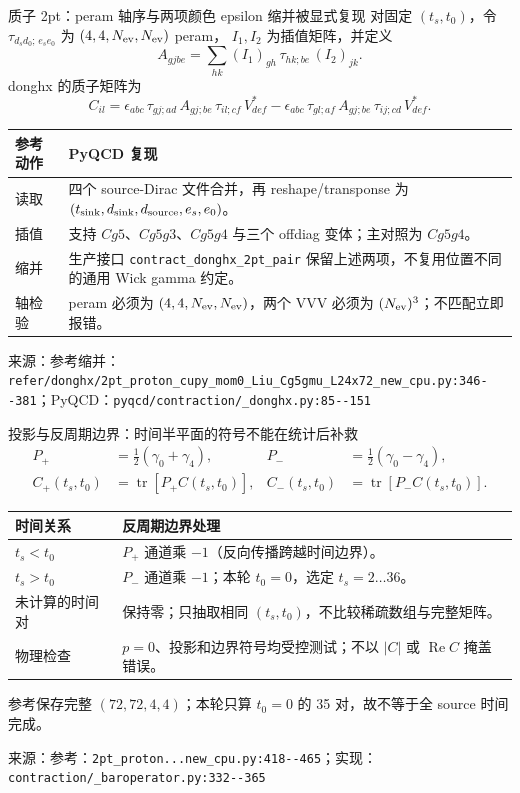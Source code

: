 \documentclass[UTF8,aspectratio=169,11pt]{ctexbeamer}
\newcommand{\source}[1]{\vspace{0.05em}\par{\raggedright\scriptsize\color{muted}来源：#1\par}}
\newcommand{\codepath}[1]{\nolinkurl{#1}}
\begin{document}
\begin{frame}[t]{质子 2pt：peram 轴序与两项颜色 epsilon 缩并被显式复现}
  \footnotesize
  对固定 $(t_s,t_0)$，令 $\tau_{d_s d_0;\,e_s e_0}$ 为 $(4,4,N_{\rm ev},N_{\rm ev})$ peram，
  $I_1,I_2$ 为插值矩阵，并定义
  \[
    A_{g j b e}=\sum_{h k}(I_1)_{g h}\,\tau_{h k;b e}\,(I_2)_{j k}.
  \]
  donghx 的质子矩阵为
  \[
    C_{il}=\epsilon_{abc}\,\tau_{g j;a d}\,A_{g j;b e}\,
      \tau_{i l;c f}\,V^{*}_{def}
    -\epsilon_{abc}\,\tau_{g l;a f}\,A_{g j;b e}\,
      \tau_{i j;c d}\,V^{*}_{def}.
  \]
  \begin{tabularx}{0.96\textwidth}{@{}L Y@{}}
    \toprule
    参考动作 & PyQCD 复现\\
    \midrule
    读取 & 四个 source-Dirac 文件合并，再 reshape/transponse 为 $(t_{\rm sink},d_{\rm sink},d_{\rm source},e_s,e_0)$。\\
    插值 & 支持 $Cg5$、$Cg5g3$、$Cg5g4$ 与三个 offdiag 变体；主对照为 $Cg5g4$。\\
    缩并 & 生产接口 \codepath{contract_donghx_2pt_pair} 保留上述两项，不复用位置不同的通用 Wick gamma 约定。\\
    轴检验 & peram 必须为 $(4,4,N_{\rm ev},N_{\rm ev})$，两个 VVV 必须为 $(N_{\rm ev})^3$；不匹配立即报错。\\
    \bottomrule
  \end{tabularx}
  \source{参考缩并：\codepath{refer/donghx/2pt_proton_cupy_mom0_Liu_Cg5gmu_L24x72_new_cpu.py:346--381}；PyQCD：\codepath{pyqcd/contraction/_donghx.py:85--151}}
\end{frame}

\begin{frame}[t]{投影与反周期边界：时间半平面的符号不能在统计后补救}
  \footnotesize
  \begin{align*}
    P_+&=\frac12(\gamma_0+\gamma_4), & P_-&=\frac12(\gamma_0-\gamma_4),\\
    C_+(t_s,t_0)&=\operatorname{tr}[P_+C(t_s,t_0)],
    &C_-(t_s,t_0)&=\operatorname{tr}[P_-C(t_s,t_0)].
  \end{align*}
  \renewcommand{\arraystretch}{1.00}
  \begin{tabularx}{0.96\textwidth}{@{}L Y@{}}
    \toprule
    时间关系 & 反周期边界处理\\
    \midrule
    $t_s<t_0$ & $P_+$ 通道乘 $-1$（反向传播跨越时间边界）。\\
    $t_s>t_0$ & $P_-$ 通道乘 $-1$；本轮 $t_0=0$，选定 $t_s=2\ldots36$。\\
    未计算的时间对 & 保持零；只抽取相同 $(t_s,t_0)$，不比较稀疏数组与完整矩阵。\\
    物理检查 & $p=0$、投影和边界符号均受控测试；不以 $|C|$ 或 $\operatorname{Re}C$ 掩盖错误。\\
    \bottomrule
  \end{tabularx}
  \colorbox{warnbg}{\parbox{0.94\linewidth}{\centering
    参考保存完整 $(72,72,4,4)$；本轮只算 $t_0=0$ 的 35 对，故不等于全 source 时间完成。}}
  \source{参考：\codepath{2pt_proton...new_cpu.py:418--465}；实现：\codepath{contraction/_baroperator.py:332--365}}
\end{frame}
\end{document}
